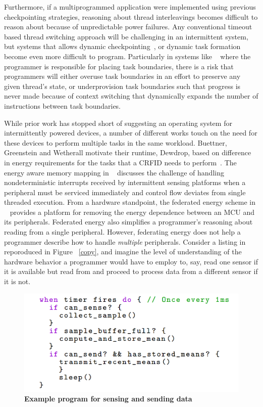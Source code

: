 \documentclass[11pt]{sensys-proc}
\begin{document}
Furthermore, if a multiprogrammed application were implemented using previous
checkpointing strategies, reasoning about thread interleavings becomes  difficult to
reason about because of unpredictable power failures. Any conventional timeout based
thread switching approach will be challenging in an intermittent system, but systems that
allows dynamic checkpointing~\cite{hibernus}, or dynamic task formation~\cite{Dino} become
even more difficult to program. Particularly in systems like ~\cite{Dino} where the
programmer is responsible for placing task boundaries, there is a risk that programmers
will either overuse task boundaries in an effort to preserve any given thread's state, or
underprovision task boundaries such that progress is never made because of context
switching that dynamically expands the number of instructions between task boundaries. 

While prior work has stopped short of suggesting an operating system for intermittently
powered devices, a number of different works touch on the need for these devices to
perform multiple tasks in the same workload. Buettner, Greenstein and Wetherall motivate
their runtime, Dewdrop, based on difference in energy requirements for the tasks that a
CRFID needs to perform~\cite{dewdrop}. The energy aware memory mapping in ~\cite{Aware}
discusses the challenge of handling nondeterministic interrupts received by intermittent
sensing platforms when a peripheral must be serviced immediately and control flow deviates
from single threaded execution. From a hardware standpoint, the federated energy scheme in
~\cite{ufop} provides a platform for removing the energy dependence between an MCU and its
peripherals. Federated energy also simplifies a programmer's reasoning about reading from
a single peripheral. However, federating energy does not help a programmer describe how to
handle {\em multiple} peripherals. Consider a listing in
~\cite{ufop} reporoduced in Figure ~\ref{copy}, and imagine the level of understanding
of the hardware behavior a programmer would have to employ to, say, read one sensor if it
is available but read from and proceed to process data from a different sensor if it is not. 

\begin{figure}[h]
  \centering
  \includegraphics[width=0.99\columnwidth]{figs/listing}
  \caption{{\bf Example program for sensing and sending data}}
  \label{fig:copy}
\end{figure}
\end{document}
